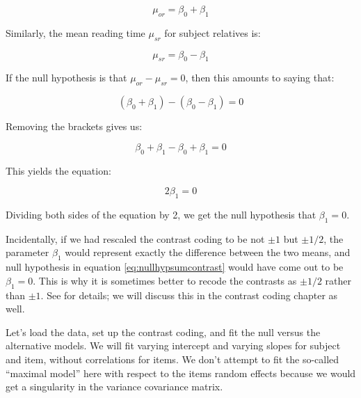 \documentclass[12pt,]{krantz}
\begin{document}
\begin{equation}
\mu_{or}=\beta_0 + \beta_1
\end{equation}

Similarly, the mean reading time \(\mu_{sr}\) for subject relatives is:

\begin{equation}
\mu_{sr}=\beta_0 - \beta_1
\end{equation}

If the null hypothesis is that \(\mu_{or}-\mu_{sr}=0\), then this amounts to saying that:

\begin{equation}
(\beta_0 + \beta_1)-(\beta_0 - \beta_1)=0
\end{equation}

Removing the brackets gives us:

\begin{equation}
\beta_0 + \beta_1-\beta_0 + \beta_1 = 0
\end{equation}

This yields the equation:

\begin{equation} \label{eq:nullhypsumcontrast}
2\beta_1= 0
\end{equation}

Dividing both sides of the equation by 2, we get the null hypothesis that \(\beta_1=0\).

Incidentally, if we had rescaled the contrast coding to be not \(\pm 1\) but \(\pm 1/2\), the parameter \(\beta_1\) would represent exactly the difference between the two means, and null hypothesis in equation \eqref{eq:nullhypsumcontrast} would have come out to be \(\beta_1= 0\). This is why it is sometimes better to recode the contrasts as \(\pm 1/2\) rather than \(\pm 1\). See \citet{SchadEtAlcontrasts} for details; we will discuss this in the contrast coding chapter as well.

Let's load the data, set up the contrast coding, and fit the null versus the alternative models. We will fit varying intercept and varying slopes for subject and item, without correlations for items. We don't attempt to fit the so-called ``maximal model'' here with respect to the items random effects because we would get a singularity in the variance covariance matrix.
\end{document}
